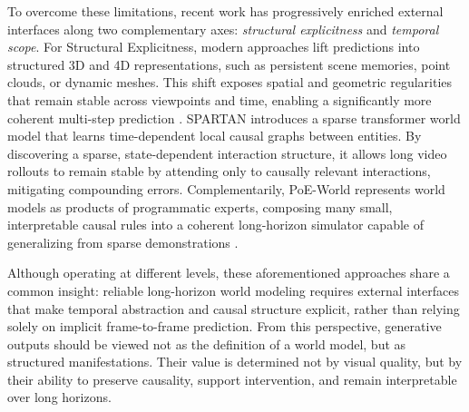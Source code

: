 \documentclass[pdflatex,sn-mathphys-num]{sn-jnl}
\theoremstyle{thmstyleone}%
\theoremstyle{thmstyletwo}%
\theoremstyle{thmstylethree}%
\begin{document}

To overcome these limitations, recent work has progressively enriched external interfaces along two complementary axes: \emph{structural explicitness} and \emph{temporal scope}. For Structural Explicitness, modern approaches lift predictions into structured 3D and 4D representations, such as persistent scene memories, point clouds, or dynamic meshes. This shift exposes spatial and geometric regularities that remain stable across viewpoints and time, enabling a significantly more coherent multi-step prediction \citep{zhou2025hermes,zhen2025tesseract}.
SPARTAN \citep{leispartan} introduces a sparse transformer world model that learns time-dependent local causal graphs between entities. By discovering a sparse, state-dependent interaction structure, it allows long video rollouts to remain stable by attending only to causally relevant interactions, mitigating compounding errors.
Complementarily, PoE-World represents world models as products of programmatic experts, composing many small, interpretable causal rules into a coherent long-horizon simulator capable of generalizing from sparse demonstrations \citep{piriyakulkij2025poe}.

Although operating at different levels, these aforementioned approaches share a common insight: reliable long-horizon world modeling requires external interfaces that make temporal abstraction and causal structure explicit, rather than relying solely on implicit frame-to-frame prediction. From this perspective, generative outputs should be viewed not as the definition of a world model, but as structured manifestations. Their value is determined not by visual quality, but by their ability to preserve causality, support intervention, and remain interpretable over long horizons.
\end{document}
